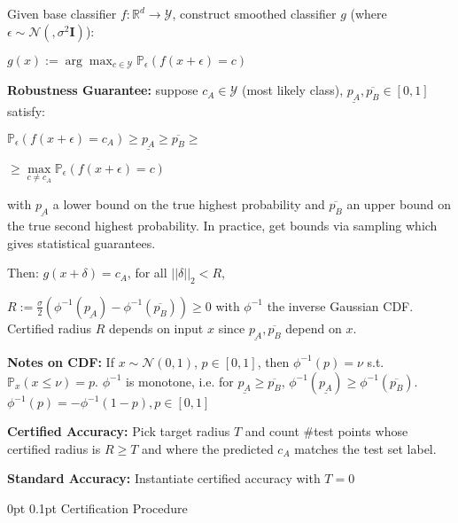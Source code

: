 \documentclass[11pt,landscape,a4paper,fleqn]{article}
\makeatletter
\renewcommand{\subsection}{\@startsection{subsection}{1}{0mm}%
                                {0pt}%
                                {0.1pt}%
                            	{\color{myorange2}\sffamily\small}}
\makeatother
\begin{document}
\begin{multicols*}{4}
Given base classifier $f: \mathbb{R}^d \rightarrow \mathcal{Y}$, construct smoothed classifier $g$ (where {$\epsilon \sim \mathcal{N}(, \sigma^2 \mathbf{I})$}):

$g(x) := \arg \max_{c \in \mathcal{Y}} \mathbb{P}_\epsilon (f(x + \epsilon) = c)$

\vspace*{1mm}
\textbf{Robustness Guarantee:} suppose $c_A \in \mathcal{Y}$ (most likely class), $\underline{p_A}, \overline{p_B} \in [0,1]$ satisfy:

$\mathbb{P}_\epsilon(f(x + \epsilon) = c_A) \geq \underline{p_A} \geq \overline{p_B} \geq$

$\geq \max\limits_{c \neq c_A} \mathbb{P}_\epsilon (f(x + \epsilon) = c)$

with $\underline{p_A}$ a lower bound on the true highest probability and $\overline{p_B}$ an upper bound on the true second highest probability. In practice, get bounds via sampling which gives statistical guarantees.

Then: {$g(x + \delta) = c_A$, for all $||\delta||_2 < R$}, 

$R := \frac{\sigma}{2}(\phi^{-1}(\underline{p_A}) - \phi^{-1}(\overline{p_B})) \geq 0$ with $\phi^{-1}$ the inverse Gaussian CDF. Certified radius $R$ depends on input $x$ since $\underline{p_A}, \overline{p_B}$ depend on $x$.

\vspace*{1mm}
\textbf{Notes on CDF:} If $x \sim \mathcal{N}(0,1)$, $p \in [0,1]$, then $\phi^{-1}(p) = \nu$ s.t. $\mathbb{P}_x (x \leq \nu) = p$. $\phi^{-1}$ is monotone, i.e. for $\underline{p_A} \geq \overline{p_B}$, $\phi^{-1}(\underline{p_A}) \geq \phi^{-1}(\overline{p_B})$.
$\phi^{-1}(p) = -\phi^{-1}(1-p), p \in [0,1]$

\vspace*{1mm}
\textbf{Certified Accuracy:} Pick target radius $T$ and count \#test points whose certified radius is $R \geq T$ and where the predicted $c_A$ matches the test set label.

\textbf{Standard Accuracy:} Instantiate certified accuracy with $T = 0$

\vspace*{1mm}
\subsection{Certification Procedure}


\end{multicols*}
\end{document}
